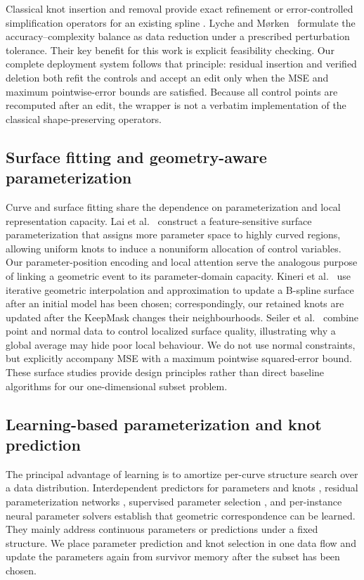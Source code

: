 \documentclass[preprint,12pt]{elsarticle}
\begin{document}
Classical knot insertion and removal provide exact refinement or
error-controlled simplification operators for an existing spline
\cite{boehm1980,tiller1992}. Lyche and M{\o}rken~\cite{lyche1988} formulate
the accuracy--complexity balance as data reduction under a prescribed
perturbation tolerance. Their key benefit for this work is explicit
feasibility checking. Our complete deployment system follows that principle:
residual insertion and verified deletion both refit the controls and accept an
edit only when the MSE and maximum pointwise-error bounds are satisfied.
Because all control points are recomputed after an edit, the wrapper is not a
verbatim implementation of the classical shape-preserving operators.

\subsection{Surface fitting and geometry-aware parameterization}
Curve and surface fitting share the dependence on parameterization and local
representation capacity. Lai et al.~\cite{lai2006} construct a
feature-sensitive surface parameterization that assigns more parameter space
to highly curved regions, allowing uniform knots to induce a nonuniform
allocation of control variables. Our parameter-position encoding and local
attention serve the analogous purpose of linking a geometric event to its
parameter-domain capacity. Kineri et al.~\cite{kineri2012} use iterative
geometric interpolation and approximation to update a B-spline surface after
an initial model has been chosen; correspondingly, our retained knots are
updated after the KeepMask changes their neighbourhoods. Seiler et
al.~\cite{seiler2018} combine point and normal data to control localized
surface quality, illustrating why a global average may hide poor local
behaviour. We do not use normal constraints, but explicitly accompany MSE
with a maximum pointwise squared-error bound. These surface studies provide
design principles rather than direct baseline algorithms for our
one-dimensional subset problem.

\subsection{Learning-based parameterization and knot prediction}
The principal advantage of learning is to amortize per-curve structure search
over a data distribution. Interdependent predictors for parameters and knots
\cite{laube2018}, residual parameterization networks \cite{scholz2021},
supervised parameter selection \cite{song2024}, and per-instance neural
parameter solvers \cite{tang2025} establish that geometric correspondence can
be learned. They mainly address continuous parameters or predictions under a
fixed structure. We place parameter prediction and knot selection in one data
flow and update the parameters again from survivor memory after the subset has
been chosen.
\end{document}
